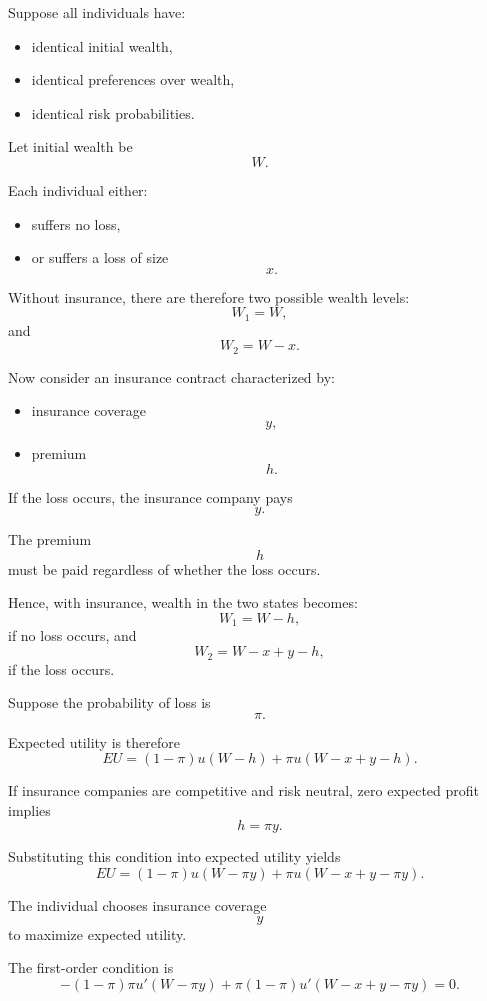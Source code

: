 Suppose all individuals have:

\begin{itemize}
    \item identical initial wealth,
    \item identical preferences over wealth,
    \item identical risk probabilities.
\end{itemize}

Let initial wealth be
\[
W.
\]

Each individual either:

\begin{itemize}
    \item suffers no loss,
    \item or suffers a loss of size
    \[
    x.
    \]
\end{itemize}

Without insurance, there are therefore two possible wealth levels:
\[
W_1=W,
\]
and
\[
W_2=W-x.
\]

Now consider an insurance contract characterized by:

\begin{itemize}
    \item insurance coverage
    \[
    y,
    \]
    \item premium
    \[
    h.
    \]
\end{itemize}

If the loss occurs, the insurance company pays
\[
y.
\]

The premium
\[
h
\]
must be paid regardless of whether the loss occurs.

Hence, with insurance, wealth in the two states becomes:
\[
W_1=W-h,
\]
if no loss occurs,
and
\[
W_2=W-x+y-h,
\]
if the loss occurs.

Suppose the probability of loss is
\[
\pi.
\]

Expected utility is therefore
\[
EU
=
(1-\pi)u(W-h)
+
\pi u(W-x+y-h).
\]

If insurance companies are competitive and risk neutral, zero expected profit implies
\[
h=\pi y.
\]

Substituting this condition into expected utility yields
\[
EU
=
(1-\pi)u(W-\pi y)
+
\pi u(W-x+y-\pi y).
\]

The individual chooses insurance coverage
\[
y
\]
to maximize expected utility.

The first-order condition is
\[
-(1-\pi)\pi u'(W-\pi y)
+
\pi(1-\pi)u'(W-x+y-\pi y)
=
0.
\]


